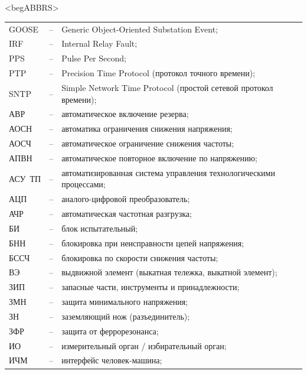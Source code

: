 \color{uniblue}\section*{}
{\color{white}\fontsize{0.1pt}{0.1pt}\selectfont<begABBRS>}
\color{black}
\begin{longtable}{>{\raggedright\arraybackslash}m{2cm}>{\raggedright\arraybackslash}m{0.5cm}>{\raggedright\arraybackslash}m{20cm}}
\endfirsthead\endhead\endfoot\endlastfoot
GOOSE & -- & Generic Object-Oriented Substation Event; \\
IRF & -- & Internal Relay Fault; \\
PPS & -- & Pulse Per Second; \\
PTP & -- & Precision Time Protocol (протокол точного времени); \\
SNTP & -- & Simple Network Time Protocol (простой сетевой протокол времени); \\
АВР & -- & автоматическое включение резерва; \\
АОСН & -- & автоматика ограничения снижения напряжения; \\
АОСЧ & -- & автоматическое ограничение снижения частоты; \\
АПВН & -- & автоматическое повторное включение по напряжению; \\
АСУ~ТП & -- & автоматизированная система управления технологическими процессами; \\
АЦП & -- & аналого-цифровой преобразователь; \\
АЧР & -- & автоматическая частотная разгрузка; \\
БИ & -- & блок испытательный; \\
БНН & -- & блокировка при неисправности цепей напряжения; \\
БССЧ & -- & блокировка по скорости снижения частоты; \\
ВЭ & -- & выдвижной элемент (выкатная тележка, выкатной элемент); \\
ЗИП & -- & запасные части, инструменты и принадлежности; \\
ЗМН & -- & защита минимального напряжения; \\
ЗН & -- & заземляющий нож (разъединитель); \\
ЗФР & -- & защита от феррорезонанса; \\
ИО & -- & измерительный орган / избирательный орган; \\
ИЧМ & -- & интерфейс человек-машина; \\

\end{longtable}
